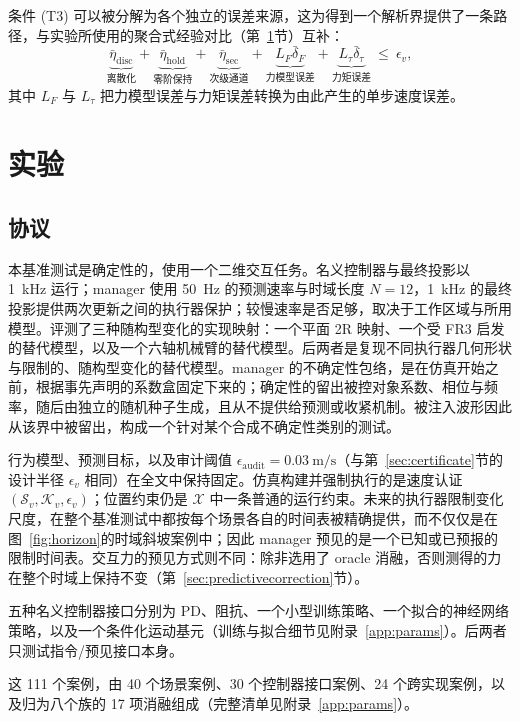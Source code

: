 \documentclass[journal]{IEEEtran}
\begin{document}
条件 (T3) 可以被分解为各个独立的误差来源，这为得到一个解析界提供了一条路径，与实验所使用的聚合式经验对比（第~\ref{sec:experiments}节）互补：
\[
\underbrace{\bar\eta_{\mathrm{disc}}}_{\text{离散化}}
+\underbrace{\bar\eta_{\mathrm{hold}}}_{\text{零阶保持}}
+\underbrace{\bar\eta_{\mathrm{sec}}}_{\text{次级通道}}
+\underbrace{L_F\bar\delta_F}_{\text{力模型误差}}
+\underbrace{L_\tau\bar\delta_\tau}_{\text{力矩误差}}
\ \le\ \epsilon_v ,
\]
其中 $L_F$ 与 $L_\tau$ 把力模型误差与力矩误差转换为由此产生的单步速度误差。

\section{实验}
\label{sec:experiments}

\subsection{协议}

本基准测试是确定性的，使用一个二维交互任务。名义控制器与最终投影以 1~kHz 运行；manager 使用 50~Hz 的预测速率与时域长度 $N=12$，1~kHz 的最终投影提供两次更新之间的执行器保护；较慢速率是否足够，取决于工作区域与所用模型。评测了三种随构型变化的实现映射：一个平面 2R 映射、一个受 FR3 启发的替代模型，以及一个六轴机械臂的替代模型。后两者是复现不同执行器几何形状与限制的、随构型变化的替代模型。manager 的不确定性包络，是在仿真开始之前，根据事先声明的系数盒固定下来的；确定性的留出被控对象系数、相位与频率，随后由独立的随机种子生成，且从不提供给预测或收紧机制。被注入波形因此从该界中被留出，构成一个针对某个合成不确定性类别的测试。

行为模型、预测目标，以及审计阈值 $\epsilon_{\mathrm{audit}}=0.03~\mathrm{m/s}$（与第~\ref{sec:certificate}节的设计半径 $\epsilon_v$ 相同）在全文中保持固定。仿真构建并强制执行的是速度认证 $(\mathcal S_v,\mathcal K_v,\epsilon_v)$；位置约束仍是 $\mathcal X$ 中一条普通的运行约束。未来的执行器限制变化尺度，在整个基准测试中都按每个场景各自的时间表被精确提供，而不仅仅是在图~\ref{fig:horizon}的时域斜坡案例中；因此 manager 预见的是一个已知或已预报的限制时间表。交互力的预见方式则不同：除非选用了 oracle 消融，否则测得的力在整个时域上保持不变（第~\ref{sec:predictivecorrection}节）。

五种名义控制器接口分别为 PD、阻抗、一个小型训练策略、一个拟合的神经网络策略，以及一个条件化运动基元（训练与拟合细节见附录~\ref{app:params}）。后两者只测试指令/预见接口本身。

这 111 个案例，由 40 个场景案例、30 个控制器接口案例、24 个跨实现案例，以及归为八个族的 17 项消融组成（完整清单见附录~\ref{app:params}）。
\end{document}
